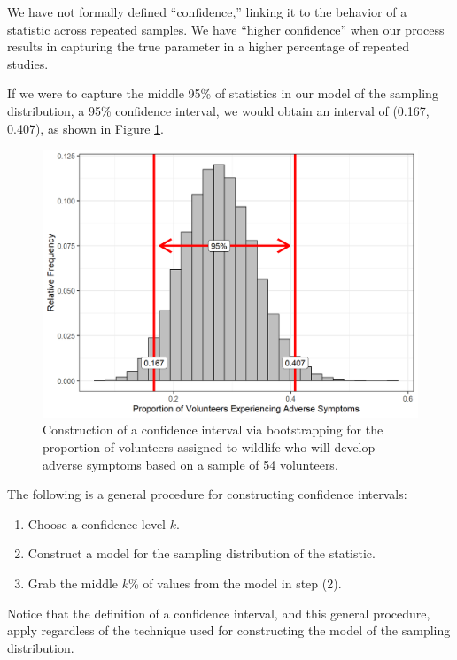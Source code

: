 \documentclass[
]{book}
\providecommand{\tightlist}{%
  \setlength{\itemsep}{0pt}\setlength{\parskip}{0pt}}
\theoremstyle{plain}
\theoremstyle{mydefn}
\theoremstyle{myexmpl}
\theoremstyle{remark}
\begin{document}
We have not formally defined ``confidence,'' linking it to the behavior of a statistic across repeated samples. We have ``higher confidence'' when our process results in capturing the true parameter in a higher percentage of repeated studies.

If we were to capture the middle 95\% of statistics in our model of the sampling distribution, a 95\% confidence interval, we would obtain an interval of (0.167, 0.407), as shown in Figure \ref{fig:samplingdistns-deepwater-ci}.

\begin{figure}

{\centering \includegraphics[width=0.8\linewidth]{./Images/samplingdistns-deepwater-ci-1} 

}

\caption{Construction of a confidence interval via bootstrapping for the proportion of volunteers assigned to wildlife who will develop adverse symptoms based on a sample of 54 volunteers.}\label{fig:samplingdistns-deepwater-ci}
\end{figure}

\begin{rmdtip}
The following is a general procedure for constructing confidence intervals:

\begin{enumerate}
\def\labelenumi{\arabic{enumi}.}
\tightlist
\item
  Choose a confidence level \(k\).
\item
  Construct a model for the sampling distribution of the statistic.
\item
  Grab the middle \(k\)\% of values from the model in step (2).
\end{enumerate}

Notice that the definition of a confidence interval, and this general procedure, apply regardless of the technique used for constructing the model of the sampling distribution.
\end{rmdtip}
\end{document}
